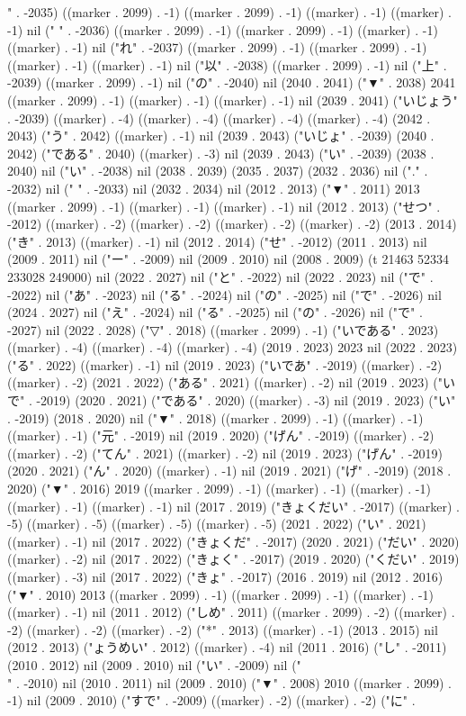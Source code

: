 " . -2035) ((marker . 2099) . -1) ((marker . 2099) . -1) ((marker) . -1) ((marker) . -1) nil (" " . -2036) ((marker . 2099) . -1) ((marker . 2099) . -1) ((marker) . -1) ((marker) . -1) nil ("れ" . -2037) ((marker . 2099) . -1) ((marker . 2099) . -1) ((marker) . -1) ((marker) . -1) nil ("以" . -2038) ((marker . 2099) . -1) nil ("上" . -2039) ((marker . 2099) . -1) nil ("の" . -2040) nil (2040 . 2041) ("▼" . 2038) 2041 ((marker . 2099) . -1) ((marker) . -1) ((marker) . -1) nil (2039 . 2041) ("いじょう" . -2039) ((marker) . -4) ((marker) . -4) ((marker) . -4) ((marker) . -4) (2042 . 2043) ("う" . 2042) ((marker) . -1) nil (2039 . 2043) ("いじょ" . -2039) (2040 . 2042) ("である" . 2040) ((marker) . -3) nil (2039 . 2043) ("い" . -2039) (2038 . 2040) nil ("い" . -2038) nil (2038 . 2039) (2035 . 2037) (2032 . 2036) nil ("." . -2032) nil (" " . -2033) nil (2032 . 2034) nil (2012 . 2013) ("▼" . 2011) 2013 ((marker . 2099) . -1) ((marker) . -1) ((marker) . -1) nil (2012 . 2013) ("せつ" . -2012) ((marker) . -2) ((marker) . -2) ((marker) . -2) ((marker) . -2) (2013 . 2014) ("き" . 2013) ((marker) . -1) nil (2012 . 2014) ("せ" . -2012) (2011 . 2013) nil (2009 . 2011) nil ("ー" . -2009) nil (2009 . 2010) nil (2008 . 2009) (t 21463 52334 233028 249000) nil (2022 . 2027) nil ("と" . -2022) nil (2022 . 2023) nil ("で" . -2022) nil ("あ" . -2023) nil ("る" . -2024) nil ("の" . -2025) nil ("で" . -2026) nil (2024 . 2027) nil ("え" . -2024) nil ("る" . -2025) nil ("の" . -2026) nil ("で" . -2027) nil (2022 . 2028) ("▽" . 2018) ((marker . 2099) . -1) ("いである" . 2023) ((marker) . -4) ((marker) . -4) ((marker) . -4) (2019 . 2023) 2023 nil (2022 . 2023) ("る" . 2022) ((marker) . -1) nil (2019 . 2023) ("いであ" . -2019) ((marker) . -2) ((marker) . -2) (2021 . 2022) ("ある" . 2021) ((marker) . -2) nil (2019 . 2023) ("いで" . -2019) (2020 . 2021) ("である" . 2020) ((marker) . -3) nil (2019 . 2023) ("い" . -2019) (2018 . 2020) nil ("▼" . 2018) ((marker . 2099) . -1) ((marker) . -1) ((marker) . -1) ("元" . -2019) nil (2019 . 2020) ("げん" . -2019) ((marker) . -2) ((marker) . -2) ("てん" . 2021) ((marker) . -2) nil (2019 . 2023) ("げん" . -2019) (2020 . 2021) ("ん" . 2020) ((marker) . -1) nil (2019 . 2021) ("げ" . -2019) (2018 . 2020) ("▼" . 2016) 2019 ((marker . 2099) . -1) ((marker) . -1) ((marker) . -1) ((marker) . -1) ((marker) . -1) nil (2017 . 2019) ("きょくだい" . -2017) ((marker) . -5) ((marker) . -5) ((marker) . -5) ((marker) . -5) (2021 . 2022) ("い" . 2021) ((marker) . -1) nil (2017 . 2022) ("きょくだ" . -2017) (2020 . 2021) ("だい" . 2020) ((marker) . -2) nil (2017 . 2022) ("きょく" . -2017) (2019 . 2020) ("くだい" . 2019) ((marker) . -3) nil (2017 . 2022) ("きょ" . -2017) (2016 . 2019) nil (2012 . 2016) ("▼" . 2010) 2013 ((marker . 2099) . -1) ((marker . 2099) . -1) ((marker) . -1) ((marker) . -1) nil (2011 . 2012) ("しめ" . 2011) ((marker . 2099) . -2) ((marker) . -2) ((marker) . -2) ((marker) . -2) ("*" . 2013) ((marker) . -1) (2013 . 2015) nil (2012 . 2013) ("ょうめい" . 2012) ((marker) . -4) nil (2011 . 2016) ("し" . -2011) (2010 . 2012) nil (2009 . 2010) nil ("い" . -2009) nil ("\\" . -2010) nil (2010 . 2011) nil (2009 . 2010) ("▼" . 2008) 2010 ((marker . 2099) . -1) nil (2009 . 2010) ("すで" . -2009) ((marker) . -2) ((marker) . -2) ("に" . 